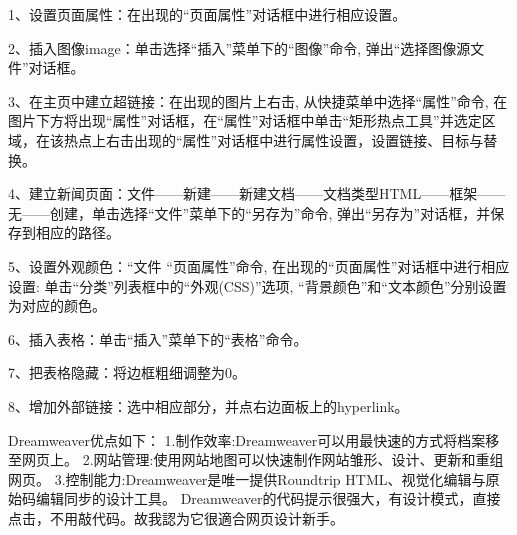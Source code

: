 \documentclass[supercite]{Experimental_Report}
\theoremstyle{definition}
\begin{document}
	1、设置页面属性：在出现的“页面属性”对话框中进行相应设置。
	
	2、插入图像image：单击选择“插入”菜单下的“图像”命令, 弹出“选择图像源文件”对话框。
	
	3、在主页中建立超链接：在出现的图片上右击, 从快捷菜单中选择“属性”命令, 在图片下方将出现“属性”对话框，在“属性”对话框中单击“矩形热点工具”并选定区域，在该热点上右击出现的“属性”对话框中进行属性设置，设置链接、目标与替换。
	
	4、建立新闻页面：文件——新建——新建文档——文档类型HTML——框架——无——创建，单击选择“文件”菜单下的“另存为”命令, 弹出“另存为”对话框，并保存到相应的路径。
	
	5、设置外观颜色：“文件 “页面属性”命令, 在出现的“页面属性”对话框中进行相应设置: 单击“分类”列表框中的“外观(CSS)”选项, “背景颜色”和“文本颜色”分别设置为对应的颜色。
	
	6、插入表格：单击“插入”菜单下的“表格”命令。
	
	7、把表格隐藏：将边框粗细调整为0。
	
	8、增加外部链接：选中相应部分，并点右边面板上的hyperlink。
	
	Dreamweaver优点如下：
	1.制作效率:Dreamweaver可以用最快速的方式将档案移至网页上。
	2.网站管理:使用网站地图可以快速制作网站雏形、设计、更新和重组网页。
	3.控制能力:Dreamweaver是唯一提供Roundtrip HTML、视觉化编辑与原始码编辑同步的设计工具。
	Dreamweaver的代码提示很强大，有设计模式，直接点击，不用敲代码。故我認为它很適合网页设计新手。
	
	\nocite{*} %
	
	
\end{document}
